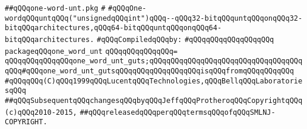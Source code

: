 \label{src/lib/std/one-word-unt.pkg}
\verb|##qQQqone-word-unt.pkg|\newline
\verb|#|\newline
\verb|#qQQqOne-wordqQQquntqQQq("unsignedqQQqint")qQQq--qQQq32-bitqQQquntqQQqonqQQq32-bitqQQqarchitectures,qQQq64-bitqQQquntqQQqonqQQq64-bitqQQqarchitectures.|\newline
\newline
\verb|#qQQqCompiledqQQqby:|\newline
\verb|#qQQqqQQqqQQqqQQqqQQq|\newline
\newline
\verb|packageqQQqone_word_unt|\newline
\verb|qQQqqQQqqQQqqQQq=|\newline
\verb|qQQqqQQqqQQqqQQqone_word_unt_guts;qQQqqQQqqQQqqQQqqQQqqQQqqQQqqQQqqQQqqQQq#qQQqone_word_unt_gutsqQQqqQQqqQQqqQQqqQQqisqQQqfromqQQqqQQqqQQq|\newline
\newline
\newline
\verb|#qQQqqQQq(C)qQQq1999qQQqLucentqQQqTechnologies,qQQqBellqQQqLaboratoriesqQQq|\newline
\verb|##qQQqSubsequentqQQqchangesqQQqbyqQQqJeffqQQqProtheroqQQqCopyrightqQQq(c)qQQq2010-2015,|\newline
\verb|##qQQqreleasedqQQqperqQQqtermsqQQqofqQQqSMLNJ-COPYRIGHT.|\newline

